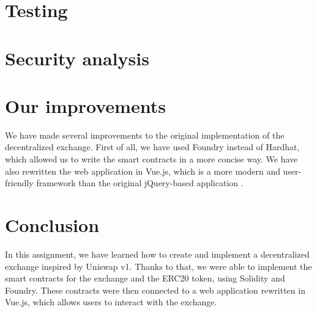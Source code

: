 \documentclass[11pt,a4paper]{article}
\begin{document}
\section{Testing}

\section{Security analysis}

\section{Our improvements}

We have made several improvements to the original implementation of the decentralized exchange.
First of all, we have used Foundry instead of Hardhat, which allowed us to write the smart contracts in a more concise way.
We have also rewritten the web application in Vue.js, which is a more modern and user-friendly framework than the original jQuery-based \quote application \quote.

\section{Conclusion}

In this assignment, we have learned how to create and implement a decentralized exchange inspired by Uniswap v1.
Thanks to that, we were able to implement the smart contracts for the exchange and the ERC20 token, using Solidity and Foundry.
These contracts were then connected to a web application rewritten in Vue.js, which allows users to interact with the exchange.



\end{document}
